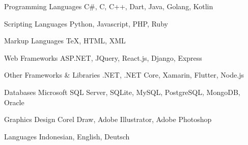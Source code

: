 \begin{cvskills}

  \cvskill
    {Programming Languages} %
    {C\#, C, C++, Dart, Java, Golang, Kotlin} %

  \cvskill
    {Scripting Languages} %
    {Python, Javascript, PHP, Ruby} %

  \cvskill
    {Markup Languages} %
    {TeX, HTML, XML} %

  \cvskill
    {Web Frameworks} %
    {ASP.NET, JQuery, React.js, Django, Express} %

  \cvskill
    {Other Frameworks \& Libraries} %
    {.NET, .NET Core, Xamarin, Flutter, Node.js} %

  \cvskill
    {Databases} %
    {Microsoft SQL Server, SQLite, MySQL, PostgreSQL, MongoDB, Oracle} %

  \cvskill
    {Graphics Design} %
    {Corel Draw, Adobe Illustrator, Adobe Photoshop} %

  \cvskill
    {Languages} %
    {Indonesian, English, Deutsch} %

\end{cvskills}
